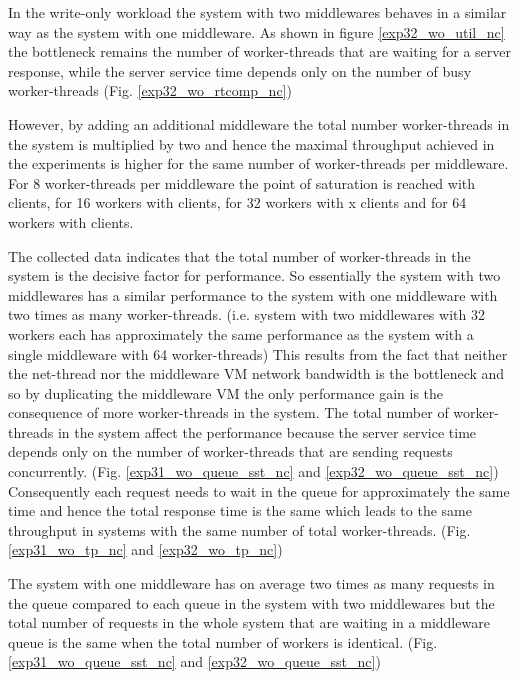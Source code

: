 \documentclass[report.tex]{subfiles}
\begin{document}
In the write-only workload the system with two middlewares behaves in a similar way as the system with one middleware. 
As shown in figure \ref{exp32_wo_util_nc} the bottleneck remains the number of worker-threads that are waiting for a server response, while the server service time depends only on the number of busy worker-threads (Fig. \ref{exp32_wo_rtcomp_nc})


However, by adding an additional middleware the total number worker-threads in the system is multiplied by two and hence the maximal throughput achieved in the experiments is higher for the same number of worker-threads per middleware.
For 8 worker-threads per middleware the point of saturation is reached with  clients, for 16 workers with  clients, for 32 workers with {x} clients and for 64 workers with  clients.  


The collected data indicates that the total number of worker-threads in the system is the decisive factor for performance.
So essentially the system with two middlewares has a similar performance to the system with one middleware with two times as many worker-threads. (i.e. system with two middlewares with 32 workers each has approximately the same performance as the system with a single middleware with 64 worker-threads)
This results from the fact that neither the net-thread nor the middleware VM network bandwidth is the bottleneck and so by duplicating the middleware VM the only performance gain is the consequence of more worker-threads in the system.
The total number of worker-threads in the system affect the performance because the server service time depends only on the number of worker-threads that are sending requests concurrently. (Fig. \ref{exp31_wo_queue_sst_nc} and \ref{exp32_wo_queue_sst_nc})
Consequently each request needs to wait in the queue for approximately the same time and hence the total response time is the same which leads to the same throughput in systems with the same number of total worker-threads. (Fig. \ref{exp31_wo_tp_nc} and \ref{exp32_wo_tp_nc})

The system with one middleware has on average two times as many requests in the queue compared to each queue in the system with two middlewares but the total number of requests in the whole system that are waiting in a middleware queue is the same when the total number of workers is identical. (Fig. \ref{exp31_wo_queue_sst_nc} and \ref{exp32_wo_queue_sst_nc})
\end{document}
